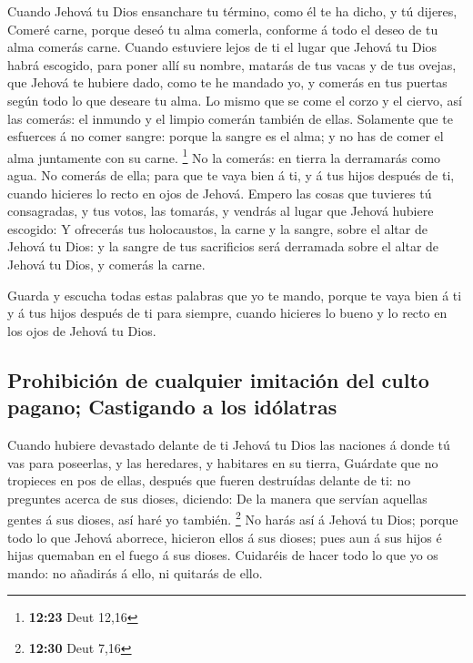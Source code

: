  Cuando Jehová tu Dios ensanchare tu término, como él te
ha dicho, y tú dijeres, Comeré carne, porque deseó tu alma comerla,
conforme á todo el deseo de tu alma comerás carne. 
Cuando estuviere lejos de ti el lugar que Jehová tu Dios habrá escogido,
para poner allí su nombre, matarás de tus vacas y de tus ovejas, que
Jehová te hubiere dado, como te he mandado yo, y comerás en tus puertas
según todo lo que deseare tu alma.  Lo mismo que se come
el corzo y el ciervo, así las comerás: el inmundo y el limpio comerán
también de ellas.  Solamente que te esfuerces á no comer
sangre: porque la sangre es el alma; y no has de comer el alma
juntamente con su carne. \footnote{\textbf{12:23} Deut 12,16}
 No la comerás: en tierra la derramarás como agua.
 No comerás de ella; para que te vaya bien á ti, y á tus
hijos después de ti, cuando hicieres lo recto en ojos de Jehová.
 Empero las cosas que tuvieres tú consagradas, y tus
votos, las tomarás, y vendrás al lugar que Jehová hubiere escogido:
 Y ofrecerás tus holocaustos, la carne y la sangre, sobre
el altar de Jehová tu Dios: y la sangre de tus sacrificios será
derramada sobre el altar de Jehová tu Dios, y comerás la carne.

 Guarda y escucha todas estas palabras que yo te mando,
porque te vaya bien á ti y á tus hijos después de ti para siempre,
cuando hicieres lo bueno y lo recto en los ojos de Jehová tu Dios.

\hypertarget{prohibiciuxf3n-de-cualquier-imitaciuxf3n-del-culto-pagano-castigando-a-los-iduxf3latras}{%
\subsection{Prohibición de cualquier imitación del culto pagano;
Castigando a los
idólatras}\label{prohibiciuxf3n-de-cualquier-imitaciuxf3n-del-culto-pagano-castigando-a-los-iduxf3latras}}

 Cuando hubiere devastado delante de ti Jehová tu Dios
las naciones á donde tú vas para poseerlas, y las heredares, y habitares
en su tierra,  Guárdate que no tropieces en pos de ellas,
después que fueren destruídas delante de ti: no preguntes acerca de sus
dioses, diciendo: De la manera que servían aquellas gentes á sus dioses,
así haré yo también. \footnote{\textbf{12:30} Deut 7,16} 
No harás así á Jehová tu Dios; porque todo lo que Jehová aborrece,
hicieron ellos á sus dioses; pues aun á sus hijos é hijas quemaban en el
fuego á sus dioses.  Cuidaréis de hacer todo lo que yo os
mando: no añadirás á ello, ni quitarás de ello.

